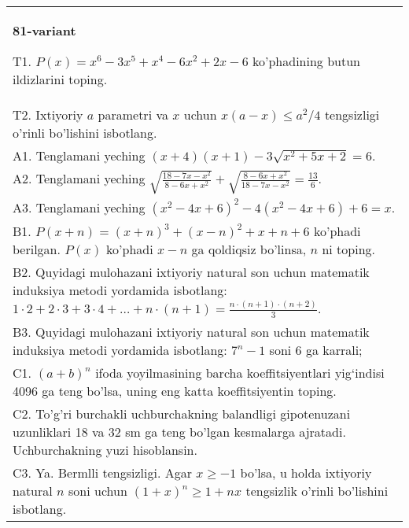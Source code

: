 \documentclass{article}
\begin{document}
\begin{tabular}{m{17cm}}
\textbf{81-variant}
\newline

T1. \(P(x) = x^{6} - 3x^{5} + x^{4} - 6x^{2} + 2x - 6\) ko'phadining butun ildizlarini toping. \\
T2. Ixtiyoriy \(a\) parametri va \(x\) uchun \(x(a - x) \leq a^{2}/4\) tengsizligi o'rinli bo'lishini isbotlang. \\
A1. Tenglamani yeching \((x + 4)(x + 1) - 3\sqrt{x^{2} + 5x + 2} = 6\). \\
A2. Tenglamani yeching \(\sqrt{\frac{18 - 7x - x^{2}}{8 - 6x + x^{2}}} + \sqrt{\frac{8 - 6x + x^{2}}{18 - 7x - x^{2}}} = \frac{13}{6}\). \\
A3. Tenglamani yeching \(\left( x^{2} - 4x + 6 \right)^{2} - 4\left( x^{2} - 4x + 6 \right) + 6 = x\). \\
B1. \(P(x + n) = (x + n)^{3} + (x - n)^{2} + x + n + 6\) ko'phadi berilgan. \(P(x)\) ko'phadi \(x - n\) ga qoldiqsiz bo'linsa, \(n\) ni toping. \\
B2. Quyidagi mulohazani ixtiyoriy natural son uchun matematik induksiya metodi yordamida isbotlang: \(1 \cdot 2 + 2 \cdot 3 + 3 \cdot 4 + \ldots + n \cdot (n + 1) = \frac{n \cdot (n + 1) \cdot (n + 2)}{3}\). \\
B3. Quyidagi mulohazani ixtiyoriy natural son uchun matematik induksiya metodi yordamida isbotlang: \(7^{n} - 1\) soni 6 ga karrali; \\
C1. \((a + b)^{n}\) ifoda yoyilmasining barcha koeffitsiyentlari yig`indisi 4096 ga teng bo'lsa, uning eng katta koeffitsiyentin toping. \\
C2. To'g'ri burchakli uchburchakning balandligi gipotenuzani uzunliklari 18 va 32 sm ga teng bo'lgan kesmalarga ajratadi. Uchburchakning yuzi hisoblansin. \\
C3. Ya. Bermlli tengsizligi. Agar \(x \geq - 1\) bo'lsa, u holda ixtiyoriy natural \(n\) soni uchun \((1 + x)^{n} \geq 1 + nx\) tengsizlik o'rinli bo'lishini isbotlang. \\

\end{tabular}
\vspace{1cm}
\end{document}
